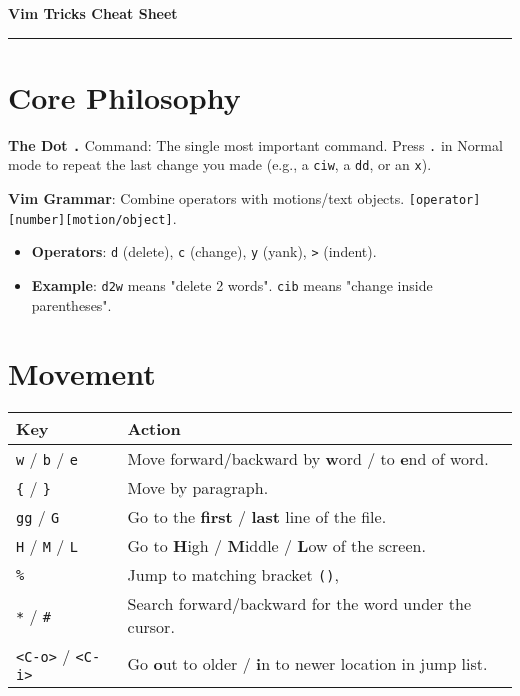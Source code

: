 \documentclass[10pt, a4paper]{article}
\newcommand{\key}[1]{\texttt{#1}}
\begin{document}
\begin{center}
    {\huge \bfseries Vim Tricks Cheat Sheet \par}
    \vspace{0.2cm}
    \hrule
\end{center}

\section*{Core Philosophy}
\noindent\textbf{The Dot \key{.}} Command: The single most important command. Press \key{.} in Normal mode to repeat the last change you made (e.g., a \key{ciw}, a \key{dd}, or an \key{x}).

\noindent\textbf{Vim Grammar}: Combine operators with motions/text objects. \texttt{[operator][number][motion/object]}.
\begin{itemize}
    \item \textbf{Operators}: \key{d} (delete), \key{c} (change), \key{y} (yank), \key{>} (indent).
    \item \textbf{Example}: \key{d2w} means "delete 2 words". \key{cib} means "change inside parentheses".
\end{itemize}

\section*{Movement}
\begin{tabularx}{\textwidth}{lX}
    \hline
    \textbf{Key} & \textbf{Action} \\
    \hline
    \key{w} / \key{b} / \key{e} & Move forward/backward by \textbf{w}ord / to \textbf{e}nd of word. \\
    \key{\{} / \key{\}} & Move by paragraph. \\
    \key{gg} / \key{G} & Go to the \textbf{first} / \textbf{last} line of the file. \\
    \key{H} / \key{M} / \key{L} & Go to \textbf{H}igh / \textbf{M}iddle / \textbf{L}ow of the screen. \\
    \key{\%} & Jump to matching bracket \key{()}, \key{\{\}, \key{[]}. \\
    \key{*} / \key{\#} & Search forward/backward for the word under the cursor. \\
    \key{<C-o>} / \key{<C-i>} & Go \textbf{o}ut to older / \textbf{i}n to newer location in jump list. \\
    \hline
\end{tabularx}
\end{document}
